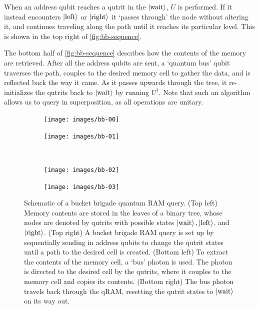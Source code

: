 \documentclass[a4paper,12pt]{article}
\begin{document}
When an address qubit reaches a qutrit in the $\ket{\hbox{wait}}$, $U$ is performed. 
If it instead encounters $\ket{\hbox{left}}$ or $\ket{\hbox{right}}$ it `passes through' the node without altering it, and continues traveling along the path until it reaches its particular level. 
This is shown in the top right of \autoref{fig:bb-sequence}.

The bottom half of \autoref{fig:bb-sequence} describes how the contents of the memory are retrieved. 
After all the address qubits are sent, a `quantum bus' qubit traverses the path, couples to the desired memory cell to gather the data, and is reflected back the way it came. 
As it passes upwards through the tree, it re-initializes the qutrits back to $\ket{\hbox{wait}}$ by running $U^\dag$. 
Note that such an algorithm allows us to query in superposition, as all operations are unitary.


\begin{figure}
 \centering  
 \captionsetup{width=.89\linewidth}
 \begin{subfigure}{0.45\textwidth}
    \centering
    \texttt{[image: images/bb-00]}
 \end{subfigure}
  \hspace{0.5cm}
  \begin{subfigure}{0.45\textwidth}
    \centering
    \texttt{[image: images/bb-01]}
 \end{subfigure} \\
    \vspace{0.5cm}
     \begin{subfigure}{0.45\textwidth}
        \centering
        \texttt{[image: images/bb-02]}
    \end{subfigure}
    \hspace{0.5cm}
    \begin{subfigure}{0.45\textwidth}
        \centering
        \texttt{[image: images/bb-03]}
    \end{subfigure}
    \caption{Schematic of a bucket brigade quantum RAM query. 
    (Top left) Memory contents are stored in the leaves of a binary tree, whose nodes are denoted by qutrits with possible states $\ket{\hbox{wait}}, \ket{\hbox{left}}$, and $\ket{\hbox{right}}$. 
    (Top right) A bucket brigade RAM query is set up by sequentially sending in address qubits to change the qutrit states until a path to the desired cell is created. 
    (Bottom left) To extract the contents of the memory cell, a `bus' photon is used.
    The photon is directed to the desired cell by the qutrits, where it couples to the memory cell and copies its contents. 
    (Bottom right) The bus photon travels back through the qRAM, resetting the qutrit states to $\ket{\hbox{wait}}$ on its way out.}
    \label{fig:bb-sequence}
\end{figure}
\end{document}
